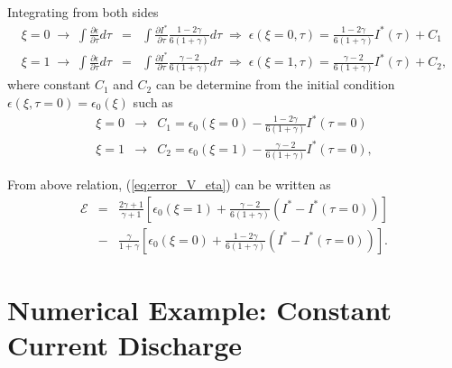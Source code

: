 \documentclass[]{article}
\begin{document}
Integrating from both sides
\begin{eqnarray}
\xi = 0 \;\rightarrow\; \int\frac{\partial\epsilon}{\partial\tau} d\tau & = & \int \frac{\partial I^*}{\partial\tau} \frac{1-2\gamma}{6(1+\gamma)}d\tau \;\Rightarrow\; \epsilon(\xi=0,\tau)=\frac{1-2\gamma}{6(1+\gamma)} I^*(\tau) +C_1\\
\xi = 1 \; \rightarrow\;\int\frac{\partial\epsilon}{\partial\tau} d\tau & = & \int \frac{\partial I^*}{\partial\tau} \frac{\gamma-2}{6(1+\gamma)}d\tau  \;\Rightarrow\; \epsilon(\xi=1,\tau)=\frac{\gamma-2}{6(1+\gamma)} I^*(\tau) +C_2, \nonumber
\end{eqnarray}
%
where constant $C_1$ and $C_2$ can be determine from the initial condition $\epsilon(\xi,\tau=0)=\epsilon_0(\xi)$ such as
%
\begin{eqnarray}
\xi = 0 &\rightarrow& C_1 = \epsilon_0(\xi=0) - \frac{1-2\gamma}{6(1+\gamma)} I^*(\tau=0)\\
\xi = 1 &\rightarrow& C_2 = \epsilon_0(\xi=1) - \frac{\gamma-2}{6(1+\gamma)}  I^*(\tau=0), \nonumber
\end{eqnarray}

From above relation, (\ref{eq:error_V_eta}) can be written as
%
\begin{eqnarray}\label{eq:error_Velectrod}
\mathcal{E} &=& \frac{2\gamma+1}{\gamma+1}\left[\epsilon_0(\xi=1) + \frac{\gamma-2}{6(1+\gamma)}(I^* - I^*(\tau=0))  \right]\\
&-& \frac{\gamma}{1+\gamma}\left[\epsilon_0(\xi=0) + \frac{1-2\gamma}{6(1+\gamma)}(I^* - I^*(\tau=0)) \right]. \nonumber
\end{eqnarray}















\section{Numerical Example: Constant Current Discharge}
\end{document}

